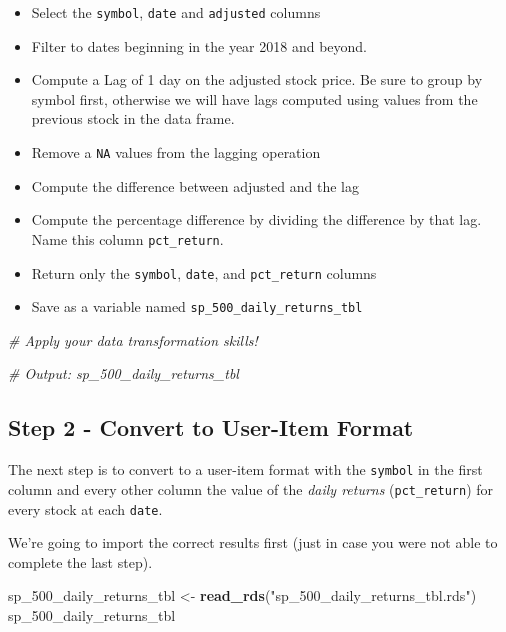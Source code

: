 \documentclass[
]{article}
\newenvironment{Shaded}{\begin{snugshade}}{\end{snugshade}}
\newcommand{\CommentTok}[1]{\textcolor[rgb]{0.56,0.35,0.01}{\textit{#1}}}
\newcommand{\DecValTok}[1]{\textcolor[rgb]{0.00,0.00,0.81}{#1}}
\newcommand{\KeywordTok}[1]{\textcolor[rgb]{0.13,0.29,0.53}{\textbf{#1}}}
\newcommand{\NormalTok}[1]{#1}
\newcommand{\StringTok}[1]{\textcolor[rgb]{0.31,0.60,0.02}{#1}}
\providecommand{\tightlist}{%
  \setlength{\itemsep}{0pt}\setlength{\parskip}{0pt}}
\begin{document}
\begin{itemize}
\tightlist
\item
  Select the \texttt{symbol}, \texttt{date} and \texttt{adjusted}
  columns
\item
  Filter to dates beginning in the year 2018 and beyond.
\item
  Compute a Lag of 1 day on the adjusted stock price. Be sure to group
  by symbol first, otherwise we will have lags computed using values
  from the previous stock in the data frame.
\item
  Remove a \texttt{NA} values from the lagging operation
\item
  Compute the difference between adjusted and the lag
\item
  Compute the percentage difference by dividing the difference by that
  lag. Name this column \texttt{pct\_return}.
\item
  Return only the \texttt{symbol}, \texttt{date}, and
  \texttt{pct\_return} columns
\item
  Save as a variable named \texttt{sp\_500\_daily\_returns\_tbl}
\end{itemize}

\begin{Shaded}
\begin{Highlighting}[]
\CommentTok{# Apply your data transformation skills!}

\CommentTok{# Output: sp_500_daily_returns_tbl}
\end{Highlighting}
\end{Shaded}

\hypertarget{step-2---convert-to-user-item-format}{%
\subsection{Step 2 - Convert to User-Item
Format}\label{step-2---convert-to-user-item-format}}

The next step is to convert to a user-item format with the
\texttt{symbol} in the first column and every other column the value of
the \emph{daily returns} (\texttt{pct\_return}) for every stock at each
\texttt{date}.

We're going to import the correct results first (just in case you were
not able to complete the last step).

\begin{Shaded}
\begin{Highlighting}[]
\NormalTok{sp_}\DecValTok{500}\NormalTok{_daily_returns_tbl <-}\StringTok{ }\KeywordTok{read_rds}\NormalTok{(}\StringTok{"sp_500_daily_returns_tbl.rds"}\NormalTok{)}
\NormalTok{sp_}\DecValTok{500}\NormalTok{_daily_returns_tbl}
\end{Highlighting}
\end{Shaded}
\end{document}
